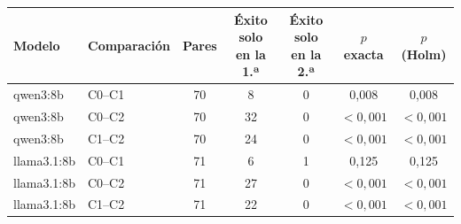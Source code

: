 \begin{tabular}{llccccc}
\toprule
Modelo & Comparación & Pares & Éxito solo en la 1.ª & Éxito solo en la 2.ª & $p$ exacta & $p$ (Holm) \\
\midrule
qwen3:8b & C0--C1 & 70 & 8 & 0 & 0{,}008 & 0{,}008 \\
qwen3:8b & C0--C2 & 70 & 32 & 0 & $<0{,}001$ & $<0{,}001$ \\
qwen3:8b & C1--C2 & 70 & 24 & 0 & $<0{,}001$ & $<0{,}001$ \\
\midrule
llama3.\allowbreak{}1:8b & C0--C1 & 71 & 6 & 1 & 0{,}125 & 0{,}125 \\
llama3.\allowbreak{}1:8b & C0--C2 & 71 & 27 & 0 & $<0{,}001$ & $<0{,}001$ \\
llama3.\allowbreak{}1:8b & C1--C2 & 71 & 22 & 0 & $<0{,}001$ & $<0{,}001$ \\
\bottomrule
\end{tabular}
